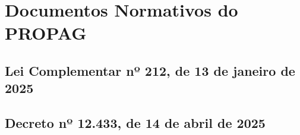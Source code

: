 \section*{Documentos Normativos do PROPAG}


\subsection{Lei Complementar nº 212, de 13 de janeiro de 2025}
\label{anexo:lei_propag}

\newpage
\thispagestyle{empty}
\mbox{}




\clearpage
\newpage
\thispagestyle{empty}
\mbox{}

\newpage
\subsection{Decreto nº 12.433, de 14 de abril de 2025}
\label{anexo:decreto_propag}


\clearpage
\newpage
\thispagestyle{empty}
\mbox{}




